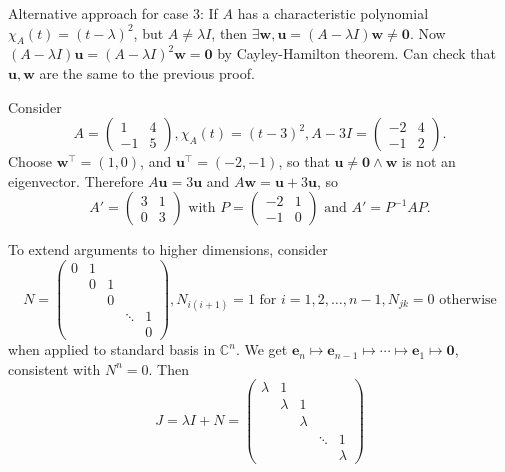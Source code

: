 \documentclass[a4paper]{article}
\begin{document}
    Alternative approach for case 3: If $A$ has a characteristic
    polynomial $ \chi_A(t)=(t-\lambda)^2 $, but $ A\neq \lambda I$,
    then $ \exists \mathbf{w}, \mathbf{u}=(A-\lambda I)\mathbf{w}
    \neq \mathbf{0} $. Now $ (A-\lambda I)\mathbf{u}=(A-\lambda
    I)^2\mathbf{w} = \mathbf{0} $ by Cayley-Hamilton theorem. Can
    check that $\mathbf{u},\mathbf{w}$ are the same to the previous proof.
    \begin{example}
      Consider
      \[
        A=
        \begin{pmatrix}
          1&4\\
          -1&5
        \end{pmatrix}, \chi_A(t)=(t-3)^2, A-3I =
        \begin{pmatrix}
          -2&4\\
          -1&2
        \end{pmatrix}.
      \]
      Choose $ \mathbf{w}^\top=(1,0) $, and
      $\mathbf{u}^\top=(-2,-1)$, so that $\mathbf{u}\neq
      \mathbf{0}\land \mathbf{w}$ is not an eigenvector. Therefore
      $A\mathbf{u}=3\mathbf{u}$ and $A\mathbf{w}=\mathbf{u}+3\mathbf{u}$, so
      \[
        A'=
        \begin{pmatrix}
          3&1\\
          0&3
        \end{pmatrix} \text{ with }P =
        \begin{pmatrix}
          -2&1\\
          -1&0
        \end{pmatrix} \text{ and } A'=P^{-1}AP.
      \]
    \end{example}
    To extend arguments to higher dimensions, consider
    \[
      N =
      \begin{pmatrix}
        0&1&&&\\
        &0&1&&\\
        &&0&&\\
        &&&\ddots&1\\
        &&&&0
      \end{pmatrix}, N_{i(i+1)}=1 \text{ for } i=1,2,\dots,n-1,
      N_{jk}=0 \text{ otherwise}
    \]
    when applied to standard basis in $ \mathbb{C}^{n} $. We get $
    \mathbf{e}_n \mapsto \mathbf{e}_{n-1} \mapsto \cdots \mapsto
    \mathbf{e}_1 \mapsto \mathbf{0} $, consistent with $ N^n=0 $. Then
    \[
      J=\lambda I+N =
      \begin{pmatrix}
        \lambda&1&&&\\
        &\lambda&1&&\\
        &&\lambda&&\\
        &&&\ddots&1\\
        &&&&\lambda
      \end{pmatrix}
    \]
\end{document}
